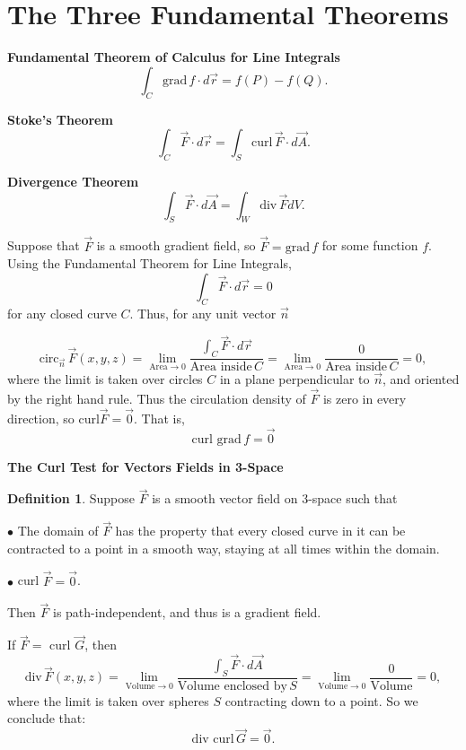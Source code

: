 \documentclass[12pt, a4paper]{article}
\theoremstyle{plain}
\theoremstyle{definition}
\newtheorem{definition}{Definition}[section]
\theoremstyle{remark}
\begin{document}
\section{The Three Fundamental Theorems}

\textbf{Fundamental Theorem of Calculus for Line Integrals}
$$ \int_C \text{grad} \, f \cdot d \vec{r} = f(P) - f(Q).$$


\textbf{Stoke's Theorem}
$$\int_C \vec{F} \cdot d\vec{r} = \int_S \text{curl} \, \vec{F} \cdot d \vec{A}. $$


\textbf{Divergence Theorem}
$$ \int_S \vec{F} \cdot d \vec{A} = \int_W \text{div} \, \vec{F} dV.$$

Suppose that $\vec{F}$ is a smooth gradient field, so $\vec{F} = \text{grad} \, f$ for some function $f$. Using the Fundamental Theorem for Line Integrals, 
$$ \int_C \vec{F} \cdot d \vec{r} = 0$$
for any closed curve $C$. Thus, for any unit vector $\vec{n}$

$$ \text{circ}_{\vec{n}} \, \vec{F}(x, y, z) = \lim_{\text{Area} \to 0} \frac{\int_C \vec{F} \cdot d\vec{r}}{\text{Area inside} \, C}  =  \lim_{\text{Area} \to 0} \frac{0}{\text{Area inside} \, C} = 0, $$
where the limit is taken over circles $C$ in a plane perpendicular to $\vec{n}$, and oriented by the right hand rule. Thus the circulation density of $\vec{F}$ is zero in every direction, so 
$\text{curl} \vec{F} = \vec{0}$.  That is,
$$ \text{curl grad} \, f = \vec{0}$$

\newpage

\textbf{The Curl Test for Vectors Fields in 3-Space}

\begin{definition}
Suppose $\vec{F}$ is a smooth vector field on 3-space such that 

$\bullet$ The domain of $\vec{F}$ has the property that every closed curve in it can be contracted to a point in a smooth way, staying at all times within the domain. 

$\bullet$ curl $\vec{F} = \vec{0}$.

Then $\vec{F}$ is path-independent, and thus is a gradient field. 
\end{definition}

\vspace{.05in}

If $\vec{F} =$ curl $\vec{G}$, then 
$$ \text{div} \, \vec{F}(x, y, z) = \lim_{\text{Volume} \to 0} \frac{\int_S \vec{F} \cdot d\vec{A}}{\text{Volume enclosed by} \, S}  =  \lim_{\text{Volume} \to 0} \frac{0}{\text{Volume}} = 0, $$
where the limit is taken over spheres $S$ contracting down to a point. So we conclude that:
$$ \text{div curl} \, \vec{G} = \vec{0}.$$
\end{document}

